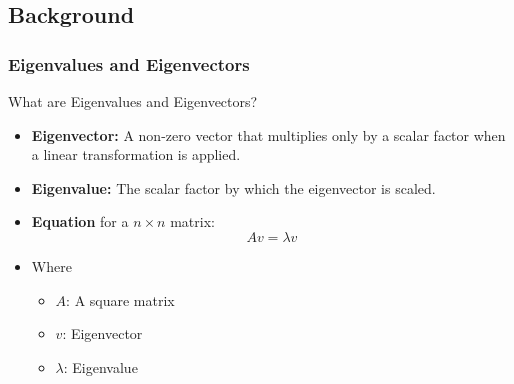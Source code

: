 \documentclass[serif, aspectratio=169]{beamer}
\begin{document}
\subsection{Background}

\subsubsection{Eigenvalues and Eigenvectors}

\begin{frame}{What are Eigenvalues and Eigenvectors?}
    \begin{itemize}
        \item \textbf{Eigenvector:} A non-zero vector that  multiplies only by a scalar factor when a linear transformation is applied.
        \item \textbf{Eigenvalue:} The scalar factor by which the eigenvector is scaled.
        \item \textbf{Equation} for a $n \times n$ matrix:
        $$Av = \lambda v$$
        \item Where
        \begin{itemize}
            \item $A$: A square matrix
            \item $v$: Eigenvector
            \item $\lambda$: Eigenvalue
        \end{itemize}
    \end{itemize}
\end{frame}
\end{document}
